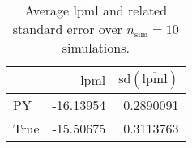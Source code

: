 \begin{table}[H]

\caption{Average lpml and related standard error over $n_{\text{sim}} = 10$ simulations.}
\centering
\begin{tabular}[t]{lrr}
\toprule
  & $\overbar{\text{lpml}}$ & $\text{sd}(\overbar{\text{lpml}})$\\
\midrule
PY & -16.13954 & 0.2890091\\
True & -15.50675 & 0.3113763\\
\bottomrule
\end{tabular}
\end{table}